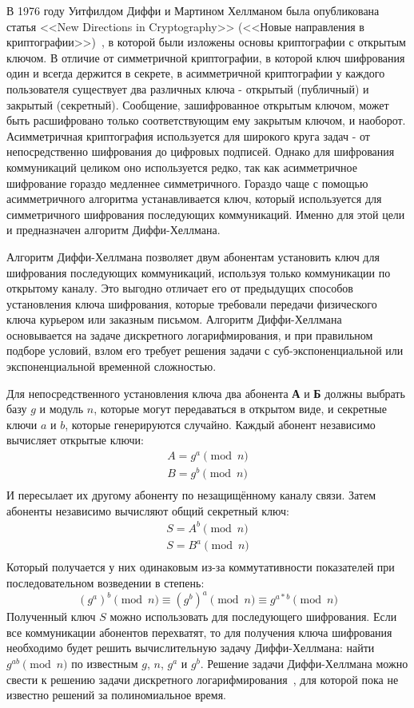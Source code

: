 \documentclass[times,specification,annotation]{itmo-student-thesis}
\begin{document}
В 1976 году Уитфилдом Диффи и Мартином Хеллманом была опубликована статья <<New Directions in Cryptography>>
(<<Новые направления в криптографии>>)~\cite{dif77}, в которой были изложены основы криптографии с открытым ключом.
В отличие от симметричной криптографии, в которой ключ шифрования один и всегда держится в секрете,
в асимметричной криптографии у каждого пользователя существует два различных ключа - открытый (публичный) и закрытый (секретный).
Сообщение, зашифрованное открытым ключом, может быть расшифровано только соответствующим ему закрытым ключом, и наоборот.
Асимметричная криптография используется для широкого круга задач - от непосредственно шифрования до цифровых подписей.
Однако для шифрования коммуникаций целиком оно используется редко, так как асимметричное шифрование гораздо
медленнее симметричного.
Гораздо чаще с помощью асимметричного алгоритма устанавливается ключ, который используется для симметричного шифрования
последующих коммуникаций.
Именно для этой цели и предназначен алгоритм Диффи-Хеллмана.\par
Алгоритм Диффи-Хеллмана позволяет двум абонентам установить ключ для шифрования последующих коммуникаций,
используя только коммуникации по открытому каналу.
Это выгодно отличает его от предыдущих способов установления ключа шифрования, которые требовали передачи
физического ключа курьером или заказным письмом.
Алгоритм Диффи-Хеллмана основывается на задаче дискретного логарифмирования, и при правильном подборе условий,
взлом его требует решения задачи с суб-экспоненциальной или экспоненциальной временной сложностью.\par
Для непосредственного установления ключа два абонента \textbf{А} и \textbf{Б} должны выбрать базу $g$ и модуль $n$, которые
могут передаваться в открытом виде, и секретные ключи $a$ и $b$, которые генерируются случайно.
Каждый абонент независимо вычисляет открытые ключи:
\begin{gather*}
    A = g^a\pmod{n}\\
    B = g^b\pmod{n}\\
\end{gather*}
И пересылает их другому абоненту по незащищённому каналу связи.
Затем абоненты независимо вычисляют общий секретный ключ:
\begin{gather*}
    S = A^b\pmod{n}\\
    S = B^a\pmod{n}\\
\end{gather*}
Который получается у них одинаковым из-за коммутативности показателей при последовательном возведении в степень:
\[(g^a)^b \pmod{n} \equiv (g^b)^a \pmod{n} \equiv g^{a*b}\pmod{n}\]
Полученный ключ $S$ можно использовать для последующего шифрования.
Если все коммуникации абонентов перехватят, то для получения ключа шифрования необходимо будет решить
вычислительную задачу Диффи-Хеллмана: найти $g^{ab}\pmod{n}$ по известным $g$, $n$, $g^a$ и $g^b$.
Решение задачи Диффи-Хеллмана можно свести к решению задачи дискретного логарифмирования~\cite{sma15},
для которой пока не известно решений за полиномиальное время.
\end{document}
